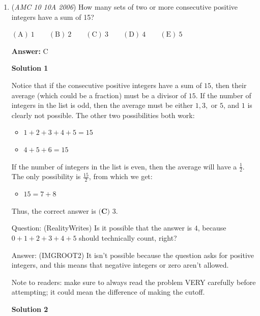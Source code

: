 \begin{enumerate}
 Which can be written as:

 $x^2+bx+c-3=0$
$4$ and $2$ are the solutions to the quadratic. Thus:

 $c-3=4\times2$
$c-3=8$
$c=\boxed{\textbf{(E) }11}$.

 


	\item (\textit{AMC 10 10A 2006}) How many sets of two or more consecutive positive integers have a sum of 15?


 $\mathrm{(A)}\ 1\qquad\mathrm{(B)}\ 2\qquad\mathrm{(C)}\ 3\qquad\mathrm{(D)}\ 4\qquad\mathrm{(E)}\ 5$

 \textbf{Answer: }C



\textbf{Solution 1}

Notice that if the consecutive positive integers have a sum of $15$, then their average (which could be a fraction) must be a divisor of $15$. If the number of integers in the list is odd, then the average must be either $1, 3,$ or $5$, and $1$ is clearly not possible. The other two possibilities both work:

 
            \begin{itemize}
        \item $1 + 2 + 3 + 4 + 5 = 15$
        \item $4 + 5 + 6 = 15$
            \end{itemize}
            If the number of integers in the list is even, then the average will have a $\frac{1}{2}$. The only possibility is $\frac{15}{2}$, from which we get:

 
            \begin{itemize}
        \item $15 = 7 + 8$
            \end{itemize}
            Thus, the correct answer is $\boxed{\textbf{(C) }3}.$

 
Question: (RealityWrites) Is it possible that the answer is $4$, because $0+1+2+3+4+5$ should technically count, right?

 Answer: (IMGROOT2) It isn't possible because the question asks for positive integers, and this means that negative integers or zero aren't allowed.

 Note to readers: make sure to always read the problem VERY carefully before attempting; it could mean the difference of making the cutoff.

 



\textbf{Solution 2}


\end{enumerate}
